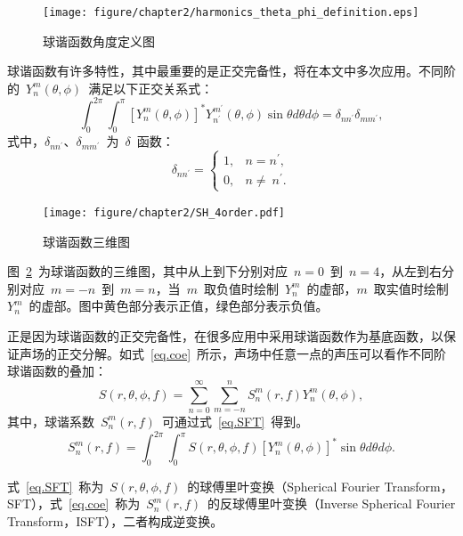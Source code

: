 \begin{figure}[H]
\centering
\texttt{[image: figure/chapter2/harmonics\_theta\_phi\_definition.eps]}
\caption{球谐函数角度定义图}
\label{fig:harmonics_theta_phi_definition}
\end{figure}

球谐函数有许多特性，其中最重要的是正交完备性，将在本文中多次应用。不同阶的~$Y_{n}^{m}(\theta,\phi)$~满足以下正交关系式：
\begin{equation}\label{eq.orth}
\int_{0}^{2\pi}\int_{0}^{\pi}[Y_{n}^{m}(\theta,\phi)]^{*}Y_{n^{'}}^{m^{'}}(\theta,\phi)\sin\theta d\theta d\phi = \delta_{nn^{'}}\delta_{mm^{'}},
\end{equation}
式中，$\delta_{nn^{'}}$、$\delta_{mm^{'}}$~为~$\delta$~函数：
\begin{equation}
\delta_{nn^{'}}=\left\{
             \begin{array}{lr}
             1 ,& n=n^{'},  \\
             0 ,& n\neq~n^{'}.
             \end{array}
\right.
\end{equation}

\begin{figure}[H]
\centering
\texttt{[image: figure/chapter2/SH\_4order.pdf]}
\caption{球谐函数三维图}
\label{fig:SH_4order}
\end{figure}

图~\ref{fig:SH_4order}~为球谐函数的三维图，其中从上到下分别对应~$n=0$~到~$n=4$，从左到右分别对应~$m=-n$~到~$m=n$，当~$m$~取负值时绘制~$Y_n^m$~的虚部，$m$~取实值时绘制~$Y_n^m$~的虚部。图中黄色部分表示正值，绿色部分表示负值。


正是因为球谐函数的正交完备性，在很多应用中采用球谐函数作为基底函数，以保证声场的正交分解。如式~\eqref{eq.coe}~所示，声场中任意一点的声压可以看作不同阶球谐函数的叠加：
\begin{equation}\label{eq.coe}
   S(r,\theta,\phi,f)=\sum _{n=0}^\infty \sum _{m=-n}^n S_n ^m(r,f)Y_n ^m(\theta,\phi),
\end{equation}
其中，球谐系数~$S_n ^m(r,f)$~可通过式~\eqref{eq.SFT}~得到。
\begin{equation}\label{eq.SFT}
   S_n ^m(r,f)=\int_{0}^{2\pi}\int _{0}^{\pi}S(r,\theta,\phi,f)[{Y_n^{m}(\theta,\phi)}]^{*}\sin \theta d\theta d\phi.
\end{equation}

式~\eqref{eq.SFT}~称为~$S(r,\theta,\phi,f)$~的球傅里叶变换（Spherical Fourier Transform，SFT），式~\eqref{eq.coe}~称为~$S_n ^m(r,f)$~的反球傅里叶变换（Inverse Spherical Fourier Transform，ISFT），二者构成逆变换。

